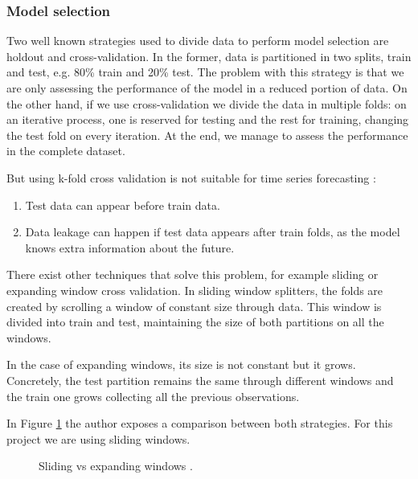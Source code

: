 \subsubsection{Model selection}
Two well known strategies used to divide data to perform model selection are holdout and cross-validation.
In the former, data is partitioned in two splits, train and test, e.g. 80\% train and 20\% test.
The problem with this strategy is that we are only assessing the performance of the model in a reduced portion of data.
On the other hand, if we use cross-validation we divide the data in multiple folds: on an iterative process, one is reserved for testing and the rest for training, changing the test fold on every iteration.
At the end, we manage to assess the performance in the complete dataset.

\noindent But using k-fold cross validation is not suitable for time series forecasting \cite{cross-validation-types}:
\begin{enumerate}
    \item Test data can appear before train data.
    \item Data leakage can happen if test data appears after train folds, as the model knows extra information about the future.
\end{enumerate}

There exist other techniques that solve this problem, for example sliding or expanding window cross validation.
In sliding window splitters, the folds are created by scrolling a window of constant size through data.
This window is divided into train and test, maintaining the size of both partitions on all the windows.

In the case of expanding windows, its size is not constant but it grows. Concretely, the test partition remains the same through different windows and the train one grows collecting all the previous observations.

In Figure \ref{fig:sliding-expanding-windows} the author exposes a comparison between both strategies. For this project we are using sliding windows.

\begin{figure}[H]
\centering
    \caption{Sliding vs expanding windows \cite{sliding-expanding-windows}.}
    \label{fig:sliding-expanding-windows}
\end{figure}


